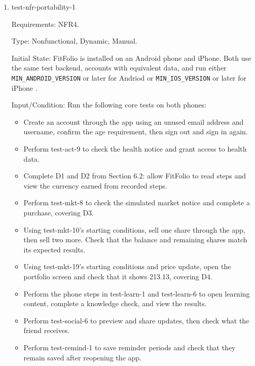\documentclass[12pt, titlepage]{article}
\begin{document}
\begin{enumerate}

\item{test-nfr-portability-1\\}

Requirements: NFR4.

Type: Nonfunctional, Dynamic, Manual.

Initial State: FitFolio is installed on an Android phone and iPhone.
Both use the same test backend, accounts with equivalent data, and run either \texttt{MIN\_ANDROID\_VERSION} or later for Andriod or \texttt{MIN\_IOS\_VERSION} or later for iPhone .

Input/Condition: Run the following core tests on both phones: 

\begin{itemize}
    \item Create an account through the app using an unused email
    address and username, confirm the age requirement, then sign
    out and sign in again.

    \item Perform test-act-9 to check the health notice and grant
    access to health data.

    \item Complete D1 and D2 from Section 6.2: allow FitFolio to
    read steps and view the currency earned from recorded steps.

    \item Perform test-mkt-8 to check the simulated market notice
    and complete a purchase, covering D3.

    \item Using test-mkt-10's starting conditions, sell one share
    through the app, then sell two more. Check that the balance
    and remaining shares match its expected results.

    \item Using test-mkt-19's starting conditions and price update,
    open the portfolio screen and check that it shows 213.13,
    covering D4.

    \item Perform the phone steps in test-learn-1 and test-learn-6
    to open learning content, complete a knowledge check, and
    view the results.

    \item Perform test-social-6 to preview and share updates,
    then check what the friend receives.

    \item Perform test-remind-1 to save reminder periods and check
    that they remain saved after reopening the app.


\end{itemize}
\end{enumerate}
\end{document}
